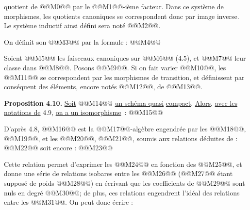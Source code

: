 
quotient de @@M0@@ par le @@M1@@-ième facteur. Dans ce système de morphismes, les quotients canoniques se correspondent donc par image inverse. Le système inductif ainsi défini sera noté @@M2@@.

On définit son @@M3@@ par la formule :
@@M4@@

Soient @@M5@@ les faisceaux canoniques sur @@M6@@ (4.5), et @@M7@@ leur classe dans @@M8@@. Posons @@M9@@. Si on fait varier @@M10@@, les @@M11@@ se correspondent par les morphismes de transition, et définissent par conséquent des éléments, encore notés @@M12@@, de @@M13@@.

\textbf{Proposition 4.10.} \uline{Soit} @@M14@@ \uline{un schéma quasi}-\uline{compact}. \uline{Alors}, \uline{avec les notations de} 4.9, \uline{on a un isomorphisme}~:
@@M15@@

D'après 4.8, @@M16@@ est la @@M17@@-algèbre engendrée par les @@M18@@, @@M19@@, et les @@M20@@, @@M21@@, soumis aux relations déduites de :
@@M22@@
soit encore :
@@M23@@

Cette relation permet d'exprimer les @@M24@@ en fonction des @@M25@@, et donne une série de relations isobares entre les @@M26@@ (@@M27@@ étant supposé de poids @@M28@@) en écrivant que les coefficients de @@M29@@ sont nuls en degré @@M30@@; de plus, ces relations engendrent l'idéal des relations entre les @@M31@@. On peut donc écrire :
